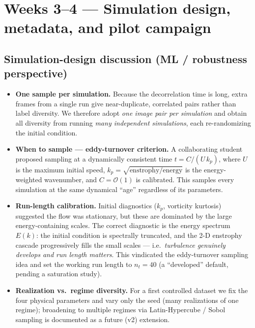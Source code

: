 \documentclass[11pt]{article}
\begin{document}
\section{Weeks 3--4 --- Simulation design, metadata, and pilot campaign}

\subsection{Simulation-design discussion (ML / robustness perspective)}
\begin{itemize}
  \item \textbf{One sample per simulation.} Because the decorrelation time is
        long, extra frames from a single run give near-duplicate, correlated pairs
        rather than label diversity. We therefore adopt \emph{one image pair per
        simulation} and obtain all diversity from running \emph{many independent
        simulations}, each re-randomizing the initial condition.
  \item \textbf{When to sample --- eddy-turnover criterion.} A collaborating
        student proposed sampling at a dynamically consistent time
        $t = C/(U\,k_p)$, where $U$ is the maximum initial speed,
        $k_p=\sqrt{\text{enstrophy}/\text{energy}}$ is the energy-weighted
        wavenumber, and $C=\mathcal{O}(1)$ is calibrated. This samples every
        simulation at the same dynamical ``age'' regardless of its parameters.
  \item \textbf{Run-length calibration.} Initial diagnostics ($k_p$, vorticity
        kurtosis) suggested the flow was stationary, but these are dominated by the
        large energy-containing scales. The correct diagnostic is the energy
        spectrum $E(k)$: the initial condition is spectrally truncated, and the
        2-D enstrophy cascade progressively fills the small scales --- i.e.\
        \emph{turbulence genuinely develops and run length matters}. This
        vindicated the eddy-turnover sampling idea and set the working run length
        to $n_t=40$ (a ``developed'' default, pending a saturation study).
  \item \textbf{Realization vs.\ regime diversity.} For a first controlled dataset
        we fix the four physical parameters and vary only the seed (many
        realizations of one regime); broadening to multiple regimes via
        Latin-Hypercube / Sobol sampling is documented as a future (v2) extension.
\end{itemize}
\end{document}
